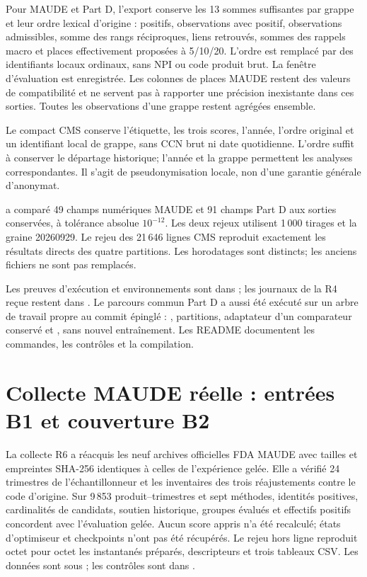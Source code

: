 Pour MAUDE et Part D, l'export conserve les 13 sommes suffisantes par grappe et leur ordre lexical d'origine : positifs, observations avec positif, observations admissibles, somme des rangs réciproques, liens retrouvés, sommes des rappels macro et places effectivement proposées à 5/10/20. L'ordre est remplacé par des identifiants locaux ordinaux, sans NPI ou code produit brut. La fenêtre d'évaluation est enregistrée. Les colonnes de places MAUDE restent des valeurs de compatibilité et ne servent pas à rapporter une précision inexistante dans ces sorties. Toutes les observations d'une grappe restent agrégées ensemble.

Le compact CMS conserve l'étiquette, les trois scores, l'année, l'ordre original et un identifiant local de grappe, sans CCN brut ni date quotidienne. L'ordre suffit à conserver le départage historique; l'année et la grappe permettent les analyses correspondantes. Il s'agit de pseudonymisation locale, non d'une garantie générale d'anonymat.

 a comparé 49 champs numériques MAUDE et 91 champs Part D aux sorties conservées, à tolérance absolue $10^{-12}$. Les deux rejeux utilisent 1\,000 tirages et la graine 20260929. Le rejeu des 21\,646 lignes CMS reproduit exactement les résultats directs des quatre partitions. Les horodatages sont distincts; les anciens fichiers ne sont pas remplacés.

Les preuves d'exécution et environnements sont dans ; les journaux de la R4 reçue restent dans . Le parcours commun Part D a aussi été exécuté sur un arbre de travail propre au commit épinglé : , partitions, adaptateur  d'un comparateur conservé et , sans nouvel entraînement. Les README documentent les commandes, les contrôles et la compilation.
\par{}
\section{Collecte MAUDE réelle : entrées B1 et couverture B2}
\label{supp:maudeB}
La collecte R6 a réacquis les neuf archives officielles FDA MAUDE avec tailles et empreintes SHA-256 identiques à celles de l'expérience gelée. Elle a vérifié 24 trimestres de l'échantillonneur et les inventaires des trois réajustements contre le code d'origine. Sur 9\,853 produit--trimestres et sept méthodes, identités positives, cardinalités de candidats, soutien historique, groupes évalués et effectifs positifs concordent avec l'évaluation gelée. Aucun score appris n'a été recalculé; états d'optimiseur et checkpoints n'ont pas été récupérés. Le rejeu hors ligne reproduit octet pour octet les instantanés préparés, descripteurs et trois tableaux CSV. Les données sont sous ; les contrôles sont dans .

